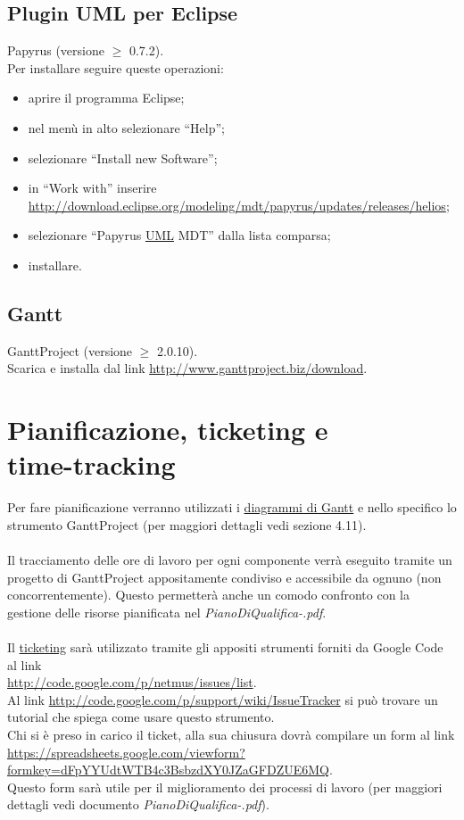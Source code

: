 \section{Plugin UML per Eclipse}
Papyrus (versione $\geq$ 0.7.2). 
\\
Per installare seguire queste
operazioni: 
\begin{itemize}
\item {aprire il programma Eclipse;} 
\item {nel men\`u in alto selezionare ``Help'';}
\item {selezionare ``Install new Software'';}
\item {in ``Work with'' inserire} \\
{\url{http://download.eclipse.org/modeling/mdt/papyrus/updates/releases/helios};}
\item {selezionare ``Papyrus \underline{UML} MDT'' dalla lista comparsa;}
\item {installare.}
\end{itemize} 

\section{Gantt}
GanttProject (versione $\geq$ 2.0.10). 
\\
Scarica e installa dal link
\url{http://www.ganttproject.biz/download}.


\chapter{Pianificazione, ticketing e \\time-tracking}
\thispagestyle{fancy}
Per fare pianificazione verranno utilizzati i \underline{diagrammi di Gantt} e
nello specifico lo strumento GanttProject (per maggiori dettagli vedi sezione 4.11). 
\\ \\
Il tracciamento delle ore di lavoro per ogni componente verr\`a eseguito
tramite un progetto di GanttProject appositamente condiviso e accessibile da ognuno (non concorrentemente). Questo permetter\`a anche un comodo confronto con la
gestione delle risorse pianificata nel \emph{PianoDiQualifica-\versionePQ.pdf}.
\\ \\
Il \underline{ticketing} sar\`a utilizzato tramite gli appositi strumenti
forniti da Google Code al link
\\\url{http://code.google.com/p/netmus/issues/list}. \\Al link
\url{http://code.google.com/p/support/wiki/IssueTracker} si pu\`o trovare un tutorial che spiega come usare questo strumento.\\
Chi si \`e preso in carico il ticket, alla sua chiusura dovr\`a
compilare un form al link
\url{https://spreadsheets.google.com/viewform?formkey=dFpYYUdtWTB4c3BsbzdXY0JZaGFDZUE6MQ}.
\\Questo form sar\`a utile per il miglioramento dei processi di lavoro (per
maggiori dettagli vedi documento \emph{PianoDiQualifica-\versionePQ.pdf}).


